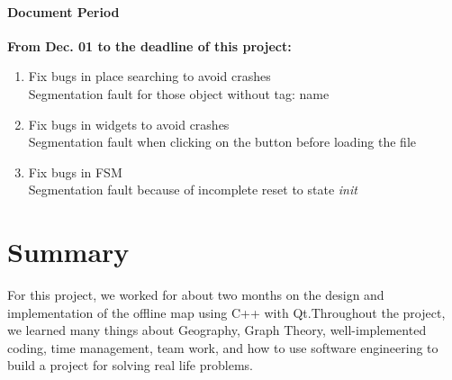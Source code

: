 \documentclass[a4paper, 12pt, english]{book}
\begin{document}
\subsubsection{Document Period}

{\textbf{From Dec. 01 to the deadline of this project:}}
\begin{enumerate}
	\item Fix bugs in place searching to avoid crashes\\
	Segmentation fault for those object without tag: name
	\item Fix bugs in widgets to avoid crashes\\
	Segmentation fault when clicking on the button before loading the file
	\item Fix bugs in FSM\\
	Segmentation fault because of incomplete reset to state {\textit{init}}
\end{enumerate}






\chapter{Summary}
For this project, we worked for about two months on the design and implementation of the offline map using C++ with Qt.Throughout the project, we learned many things about Geography, Graph Theory, well-implemented coding, time management, team work, and how to use software engineering to build a project for solving real life problems.\\
\end{document}
